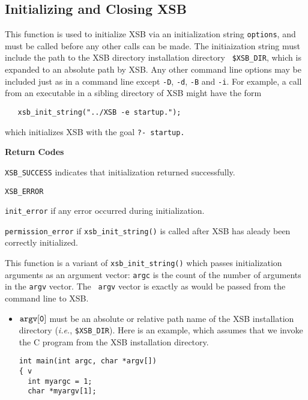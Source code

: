 \subsection{Initializing and Closing XSB}

\begin{description}

 This function is used to initialize
XSB via an initialization string {\tt *options}, and must be called
before any other calls can be made.  The initiaization string must
include the path to the XSB directory installation directory {\tt
\$XSB\_DIR}, which is expanded to an absolute path by XSB.  Any other
  command line options may be included just as in a command line
  except {\tt -D}, {\tt -d}, {\tt -B} and {\tt -i}.  For example, a
  call from an executable in a sibling directory of XSB might have the
  form
\begin{verbatim}
   xsb_init_string("../XSB -e startup.");
\end{verbatim}
which initializes XSB with the goal {\tt ?- startup.}

{\bf Return Codes}  
\bi
\item {\tt XSB\_SUCCESS} indicates that initialization returned
  successfully.
%
\item {\tt XSB\_ERROR} 
\bi
\item {\tt init\_error} if any error occurred during initialization. 

\item {\tt permission\_error} if {\tt xsb\_init\_string()} is called
  after XSB has aleady been correctly initialized.  
\ei
%
\ei

 
%
This function is a variant of {\tt xsb\_init\_string()} which passes
initialization arguments as an argument vector: {\tt argc} is the
count of the number of arguments in the {\tt argv} vector.  The {\tt
  argv} vector is exactly as would be passed from the command line to
XSB.
\begin{itemize}
\item $\tt argv[0]$ must be an absolute or relative path name of the XSB
  installation directory ({\it i.e.}, {\tt \$XSB\_DIR}).  Here is an
  example, which assumes that we invoke the C program from the XSB
  installation directory.
    \begin{verbatim}
int main(int argc, char *argv[])
{ v
  int myargc = 1;
  char *myargv[1];


\end{verbatim}
\end{itemize}
\end{description}
